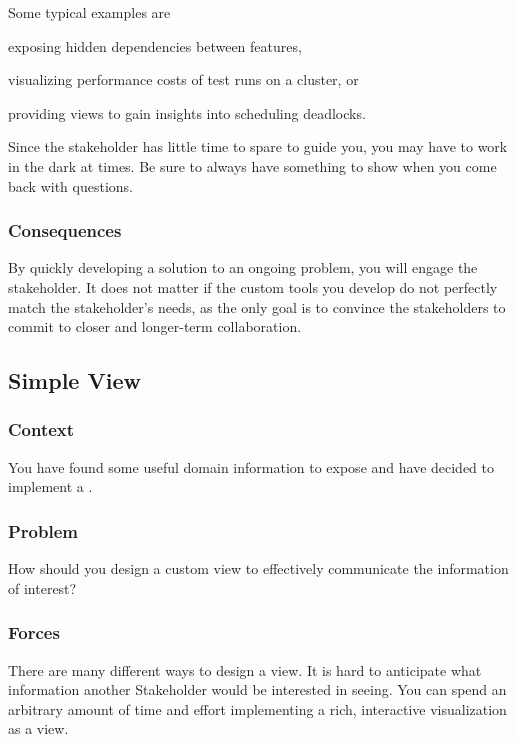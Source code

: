 \documentclass[sigconf]{acmart}
\newcommand\on[1]{\nbc{ON}{#1}{olive}} %
\newcommand{\pattern}[1]{\emph{\nameref{pat:#1}}\xspace}
\begin{document}
Some typical examples are 
\begin{inparaenum}[(i)]
\item exposing hidden dependencies between features, 
\item visualizing performance costs of test runs on a cluster, or
\item providing views to gain insights into scheduling deadlocks.
\end{inparaenum}

Since the stakeholder has little time to spare to guide you, you may have to work in the dark at times.
Be sure to always have something to show when you come back with questions.

\subsubsection*{Consequences}
By quickly developing a solution to an ongoing problem, you will engage the stakeholder.
It does not matter if the custom tools you develop do not perfectly match the stakeholder's needs, as the only goal is to convince the stakeholders to commit to closer and longer-term collaboration.

\subsection*{Simple View}\label{pat:simpleView}
\subsubsection*{Context}
You have found some useful domain information to expose and have decided to implement a \pattern{customView}.

\subsubsection*{Problem}
How should you design a custom view to effectively communicate the information of interest?

\subsubsection*{Forces}
There are many different ways to design a view.
It is hard to anticipate what information another Stakeholder would be interested in seeing.
You can spend an arbitrary amount of time and effort implementing a rich, interactive visualization as a view.
\end{document}
